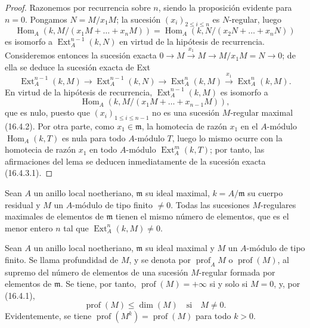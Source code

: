 \begin{proof}
Razonemos por recurrencia sobre $n$, siendo la proposición evidente para
$n=0$. Pongamos $N=M/x_1M$; la sucesión $(x_i)_{2\leq i\leq n}$ es
$N$-regular, luego
\[
  \operatorname{Hom}_A(k,M/(x_1M+\ldots+x_nM))
  =\operatorname{Hom}_A(k,N/(x_2N+\ldots+x_nN))
\]
es isomorfo a $\operatorname{Ext}^{n-1}_A(k,N)$ en virtud de la hipótesis de
recurrencia. Consideremos entonces la sucesión exacta
$0\to M\xrightarrow{x_1}M\to M/x_1M=N\to0$; de ella se deduce la sucesión
exacta de Ext
\begin{equation}
\label{0.16.4.3.1-es}
\tag{16.4.3.1}
  \operatorname{Ext}^{n-1}_A(k,M)
  \to\operatorname{Ext}^{n-1}_A(k,N)
  \to\operatorname{Ext}^n_A(k,M)
  \xrightarrow{x_1}\operatorname{Ext}^n_A(k,M).
\end{equation}
En virtud de la hipótesis de recurrencia, $\operatorname{Ext}^{n-1}_A(k,M)$
es isomorfo a
\[
  \operatorname{Hom}_A(k,M/(x_1M+\ldots+x_{n-1}M)),
\]
que es nulo, puesto que $(x_i)_{1\leq i\leq n-1}$ no es una sucesión
$M$-regular maximal (16.4.2). Por otra parte, como
$x_1\in\mathfrak{m}$, la homotecia de razón $x_1$ en el $A$-módulo
$\operatorname{Hom}_A(k,T)$ es nula para todo $A$-módulo $T$, luego lo mismo
ocurre con la homotecia de razón $x_1$ en todo $A$-módulo
$\operatorname{Ext}^m_A(k,T)$; por tanto, las afirmaciones del lema se deducen
inmediatamente de la sucesión exacta (16.4.3.1).
\end{proof}

\begin{corollary}[16.4.4]
\label{0.16.4.4-es}
Sean $A$ un anillo local noetheriano, $\mathfrak{m}$ su ideal maximal,
$k=A/\mathfrak{m}$ su cuerpo residual y $M$ un $A$-módulo de tipo finito
$\neq0$. Todas las sucesiones $M$-regulares maximales de elementos de
$\mathfrak{m}$ tienen el mismo número de elementos, que es el menor entero $n$
tal que $\operatorname{Ext}^n_A(k,M)\neq0$.
\end{corollary}

\begin{definition}[16.4.5]
\label{0.16.4.5-es}
Sean $A$ un anillo local noetheriano, $\mathfrak{m}$ su ideal maximal y $M$ un
$A$-módulo de tipo finito. Se llama profundidad de $M$, y se denota por
$\operatorname{prof}_A M$ o $\operatorname{prof}(M)$, al supremo del número de
elementos de una sucesión $M$-regular formada por elementos de
$\mathfrak{m}$. Se tiene, por tanto, $\operatorname{prof}(M)=+\infty$ si y
solo si $M=0$, y, por (16.4.1),
\begin{equation}
\label{0.16.4.5.1-es}
\tag{16.4.5.1}
  \operatorname{prof}(M)\leq\dim(M)\quad\text{si}\quad M\neq0.
\end{equation}
Evidentemente, se tiene $\operatorname{prof}(M^k)=\operatorname{prof}(M)$ para
todo $k>0$.
\end{definition}

